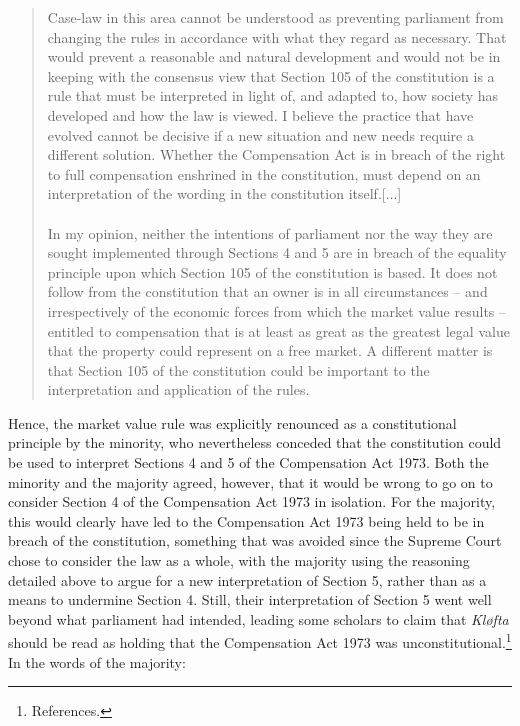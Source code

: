 \begin{quote}
Case-law in this area cannot be understood as preventing parliament from changing the rules in accordance with what they regard as necessary. That would prevent a reasonable and natural development and would not be in keeping with the consensus view that Section 105 of the constitution is a rule that must be interpreted in light of, and adapted to, how society has developed and how the law is viewed. I believe the practice that have evolved cannot be decisive if a new situation and new needs require a different solution. Whether the Compensation Act is in breach of the right to full compensation enshrined in the constitution, must depend on an interpretation of the wording in the constitution itself.[...] \\ \\
In my opinion, neither the intentions of parliament nor the way they are sought implemented through Sections 4 and 5 are in breach of the equality principle upon which Section 105 of the constitution is based. It does not follow from the constitution that an owner is in all circumstances -- and irrespectively of the economic forces from which the market value results -- entitled to compensation that is at least as great as the greatest legal value that the property could represent on a free market. A different matter is that Section 105 of the constitution could be important to the interpretation and application of the rules.
\end{quote} 

Hence, the market value rule was explicitly renounced as a constitutional principle by the minority, who nevertheless conceded that the constitution could be used to interpret Sections 4 and 5 of the Compensation Act 1973. Both the minority and the majority agreed, however, that  it would be wrong to go on to consider Section 4 of the Compensation Act 1973 in isolation. For the majority, this would clearly have led to the Compensation Act 1973 being held to be in breach of the constitution, something that was avoided since the Supreme Court chose to consider the law as a whole, with the majority using the reasoning detailed above to argue for a new interpretation of Section 5, rather than as a means to undermine Section 4. Still, their interpretation of Section 5 went well beyond what parliament had intended, leading some scholars to claim that \emph{Kløfta} should be read as holding that the Compensation Act 1973 was unconstitutional.\footnote{References.} In the words of the majority:

